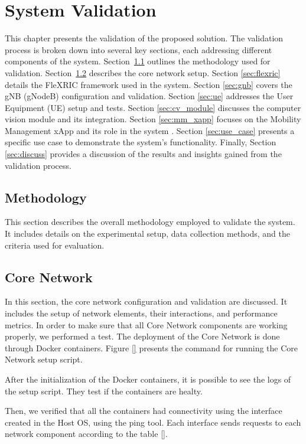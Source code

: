 \chapter{System Validation}\label{ch:validation}

This chapter presents the validation of the proposed solution.
The validation process is broken down into several key sections, each addressing different components of the system.
Section~\ref{sec:meth} outlines the methodology used for validation.
Section~\ref{sec:core_network} describes the core network setup. Section \ref{sec:flexric} details the FleXRIC framework used in the system.
Section \ref{sec:gnb} covers the gNB (gNodeB) configuration and validation. Section \ref{sec:ue} addresses the User Equipment (UE) setup and tests.
Section \ref{sec:cv_module} discusses the computer vision module and its integration. Section \ref{sec:mm_xapp} focuses on the Mobility Management xApp and its role in the system .
Section \ref{sec:use_case} presents a specific use case to demonstrate the system's functionality.
Finally, Section \ref{sec:discuss} provides a discussion of the results and insights gained from the validation process.

\section{Methodology}\label{sec:meth}
This section describes the overall methodology employed to validate the system. It includes details on the experimental setup, data collection methods, and the criteria used for evaluation.

\section{Core Network}\label{sec:core_network}
In this section, the core network configuration and validation are discussed. It includes the setup of network elements, their interactions, and performance metrics.
In order to make sure that all Core Network components are working properly, we performed a test.
The deployment of the Core Network is done through Docker containers. Figure \ref{} presents the command for running the Core Network setup script.

After the initialization of the Docker containers, it is possible to see the logs of the setup script. They test if the containers are healty.

Then, we verified that all the containers had connectivity using the interface created in the Host OS, using the ping tool.
Each interface sends requests to each network component according to the table \ref{}.


